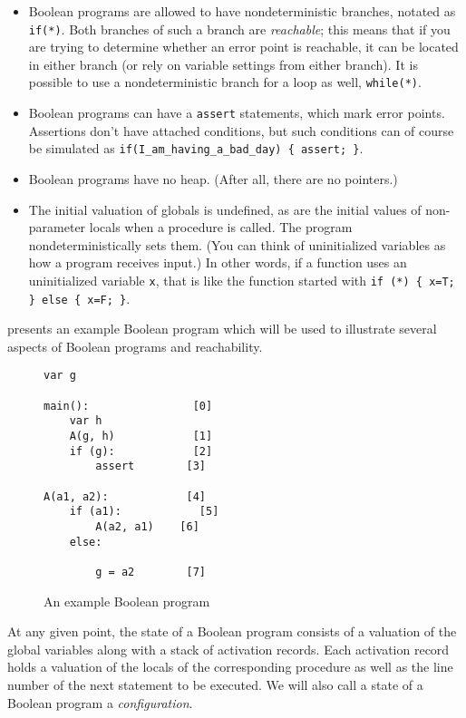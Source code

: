 \documentclass{article}
\newcommand{\Code}[1]{\texttt{#1}}
\begin{document}
\begin{itemize}
  \item 
    Boolean programs are allowed to have nondeterministic branches,
    notated as \Code{if(*)}. Both branches of such a branch are
    \emph{reachable}; this means that if you are trying to determine
    whether an error point is reachable, it can be located in either
    branch (or rely on variable settings from either branch). It is
    possible to use a nondeterministic branch for a loop as well,
    \Code{while(*)}.

  \item
    Boolean programs can have a \Code{assert} statements, which mark
    error points. Assertions don't have attached conditions, but such
    conditions can of course be simulated as
    \Code{if(I\_am\_having\_a\_bad\_day) \{ assert; \}}.


  \item
    Boolean programs have no heap. (After all, there are no pointers.)

  \item
    The initial valuation of globals is undefined, as are the initial
    values of non-parameter locals when a procedure is called. The
    program nondeterministically sets them. (You can think of
    uninitialized variables as how a program receives input.) In other
    words, if a function uses an uninitialized variable \Code{x}, that
    is like the function started with \Code{if (*) \{ x=T; \} else \{
      x=F; \}}.
\end{itemize}

 presents an example Boolean program
which will be used to illustrate several aspects of Boolean programs
and reachability.

\begin{figure}
\begin{verbatim}
var g

main():                [0]
    var h
    A(g, h)            [1]
    if (g):            [2]
        assert        [3]

A(a1, a2):            [4]
    if (a1):            [5]
        A(a2, a1)    [6]
    else:       

        g = a2        [7]
\end{verbatim}
\caption{An example Boolean program}
\label{fi:boolean-example-program}
\end{figure}


At any given point, the state of a Boolean program consists of a
valuation of the global variables along with a stack of activation
records. Each activation record holds a valuation of the locals of the
corresponding procedure as well as the line number of the next
statement to be executed. We will also call a state of a Boolean
program a \emph{configuration}.
\end{document}
